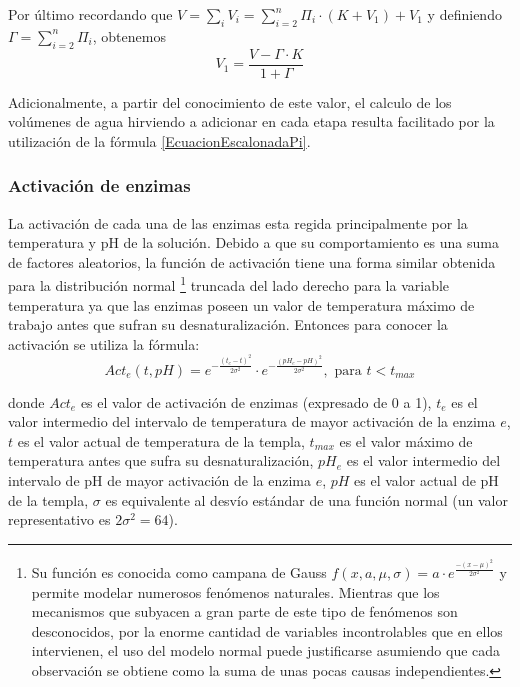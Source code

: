 \begin{itemize}
                \par Por último recordando que $V = \sum_i V_i = \sum_{i=2}^{n} \Pi_i \cdot(K + V_1) + V_1$ y definiendo $\Gamma = \sum_{i=2}^n \Pi_i$, obtenemos
                \begin{equation}
                    V_1 = \frac{V - \Gamma \cdot K}{1 + \Gamma}
                \label{EcuacionEscalonadaGamma}
                \end{equation}
                
                \par Adicionalmente, a partir del conocimiento de este valor, el calculo de los volúmenes de agua hirviendo a adicionar en cada etapa resulta facilitado por la utilización de la fórmula \ref{EcuacionEscalonadaPi}.
            \end{itemize} %
            
        \subsubsection{Activación de enzimas}
        \par La activación de cada una de las enzimas esta regida principalmente por la temperatura y pH de la solución. Debido a que su comportamiento es una suma de factores aleatorios, la función de activación tiene una forma similar obtenida para la distribución normal \footnote{Su función es conocida como campana de Gauss $f(x,a,\mu, \sigma) = a\cdot e^{\frac{-(x - \mu)^2}{2\sigma^2}}$ y permite modelar numerosos fenómenos naturales. Mientras que los mecanismos que subyacen a gran parte de este tipo de fenómenos son desconocidos, por la enorme cantidad de variables incontrolables que en ellos intervienen, el uso del modelo normal puede justificarse asumiendo que cada observación se obtiene como la suma de unas pocas causas independientes.} truncada del lado derecho para la variable temperatura ya que las enzimas poseen un valor de temperatura máximo de trabajo antes que sufran su desnaturalización. Entonces para conocer la activación se utiliza la fórmula:
        \begin{equation}
            Act_e(t, pH) = e^{- \frac{(t_e - t)^2}{2\sigma^2}} \cdot e^{- \frac{(pH_e - pH)^2}{2\sigma^2}}, \text{ para }t< t_{max}
            \label{EcuacionActivacionEnzimas}
        \end{equation}
        \par donde $Act_e$ es el valor de activación de enzimas (expresado de 0 a 1), $t_e$ es el valor intermedio del intervalo de temperatura de mayor activación de la enzima $e$, $t$ es el valor actual de temperatura de la templa, $t_{max}$ es el valor máximo de temperatura antes que sufra su desnaturalización, $pH_e$ es el valor intermedio del intervalo de pH de mayor activación de la enzima $e$, $pH$ es el valor actual de pH de la templa, $\sigma$ es equivalente al desvío estándar de una función normal (un valor representativo es $2\sigma^2=64$). 
        
